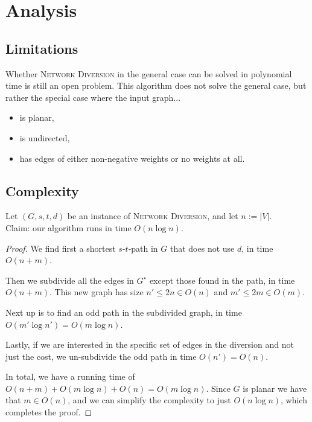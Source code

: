 \section{Analysis}

\subsection{Limitations}
Whether \textsc{Network Diversion} in the general case can be solved in polynomial time is still an open problem.
This algorithm does not solve the general case, but rather the special case where the input graph...
\begin{itemize}
    \item is planar,
    \item is undirected,
    \item has edges of either non-negative weights or no weights at all.
\end{itemize}


\subsection{Complexity}
\label{subsection:network-diversion-complexity}
Let $(G, s, t, d)$ be an instance of \textsc{Network Diversion}, and let $n := |V|$. \\
Claim: our algorithm runs in time $O(n \log n)$.

\begin{proof}
    We find first a shortest $s$-$t$-path in $G$ that does not use $d$, in time $O(n+m)$.

    Then we subdivide all the edges in $G^\star$ except those found in the path, in time $O(n+m)$. This new graph has size $n' \leq 2n \in O(n)$ and $m' \leq 2m \in O(m)$.

    Next up is to find an odd path in the subdivided graph, in time $O(m' \log n') = O(m \log n)$.

    Lastly, if we are interested in the specific set of edges in the diversion and not just the cost, we un-subdivide the odd path in time $O(n') = O(n)$.

    In total, we have a running time of $O(n+m) + O(m \log n) + O(n) = O(m \log n)$. Since $G$ is planar we have that $m \in O(n)$, and we can simplify the complexity to just $O(n \log n)$, which completes the proof.
\end{proof}


